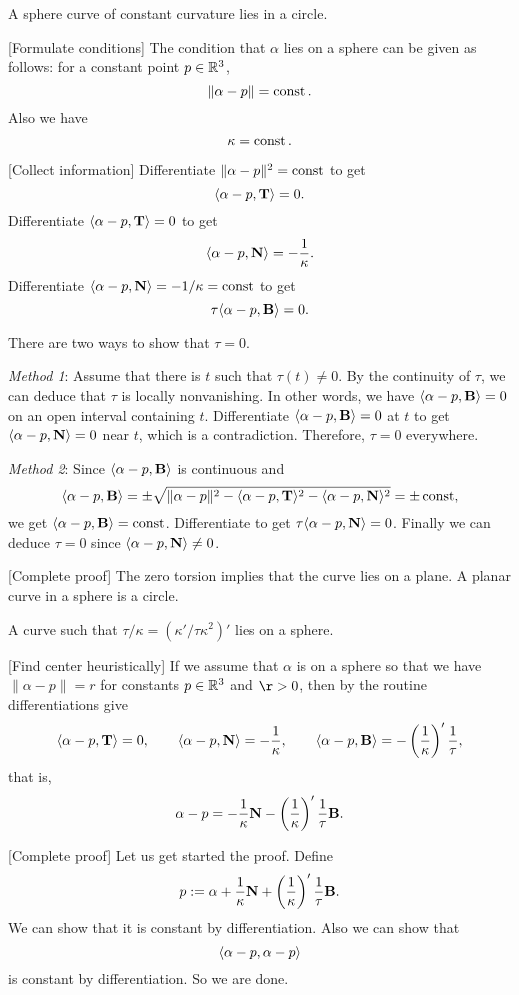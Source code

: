 \documentclass{../exp}
\def\a{\alpha}
\begin{document}
\begin{ex}
A sphere curve of constant curvature lies in a circle.
\end{ex}
\begin{pf}
[Formulate conditions]
The condition that $\a$ lies on a sphere can be given as follows: for a constant point $p\in\mathbb{R}^3$,
\[\|\a-p\|=\const.\]
Also we have
\[\kappa=\operatorname{const}.\]

[Collect information]
Differentiate $\|\a-p\|^2=\const$ to get
\[\<\a-p,\bT\>=0.\]
Differentiate $\<\a-p,\bT\>=0$ to get
\[\<\a-p,\bN\>=-\frac1\kappa.\]
Differentiate $\<\a-p,\bN\>=-1/\kappa=\const$ to get
\[\tau\<\a-p,\bB\>=0.\]

There are two ways to show that $\tau=0$.

\emph{Method 1}:
Assume that there is $t$ such that $\tau(t)\ne0$.
By the continuity of $\tau$, we can deduce that $\tau$ is locally nonvanishing.
In other words, we have $\<\a-p,\bB\>=0$ on an open interval containing $t$.
Differentiate $\<\a-p,\bB\>=0$ at $t$ to get $\<\a-p,\bN\>=0$ near $t$, which is a contradiction.
Therefore, $\tau=0$ everywhere.

\emph{Method 2}:
Since $\<\a-p,\bB\>$ is continuous and
\[\<\a-p,\bB\>=\pm\sqrt{\|\a-p\|^2-\<\a-p,\bT\>^2-\<\a-p,\bN\>^2}=\pm\const,\]
we get $\<\a-p,\bB\>=\const$.
Differentiate to get $\tau\<\a-p,\bN\>=0$.
Finally we can deduce $\tau=0$ since $\<\a-p,\bN\>\ne0$.

[Complete proof]
The zero torsion implies that the curve lies on a plane.
A planar curve in a sphere is a circle.
\end{pf}

\begin{ex}
A curve such that $\tau/\kappa=(\kappa'/\tau\kappa^2)'$ lies on a sphere.
\end{ex}
\begin{pf}
[Find center heuristically]
If we assume that $\a$ is on a sphere so that we have $\|\a-p\|=r$ for constants $p\in\mathbb{R}^3$ and $\r>0$, then by the routine differentiations give
\[\<\a-p,\bT\>=0,\qquad\<\a-p,\bN\>=-\frac1\kappa,\qquad\<\a-p,\bB\>=-\left(\frac1\kappa\right)'\frac1\tau,\]
that is,
\[\a-p=-\frac1\kappa\bN-\left(\frac1\kappa\right)'\frac1\tau\bB.\]

[Complete proof]
Let us get started the proof.
Define
\[p:=\a+\frac1\kappa\bN+\left(\frac1\kappa\right)'\frac1\tau\bB.\]
We can show that it is constant by differentiation.
Also we can show that
\[\<\a-p,\a-p\>\]
is constant by differentiation.
So we are done.
\end{pf}
\end{document}

